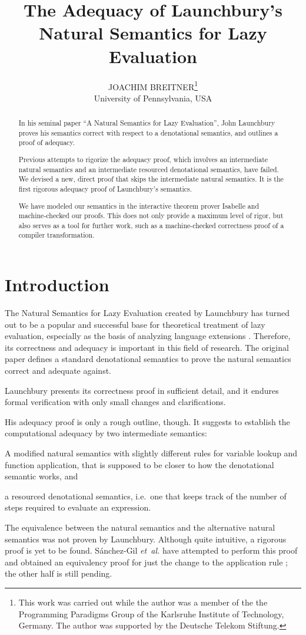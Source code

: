 \documentclass{jfp1}
\title[The Adequacy of Launchbury's Semantics]
      {The Adequacy of Launchbury's\\ Natural Semantics for Lazy Evaluation}
\author[J. Breitner]
	{JOACHIM BREITNER\thanks{This work was carried out while the author was
	a member of the the Programming Paradigms Group of the Karlsruhe
	Institute of Technology, Germany. The author was supported by the
	Deutsche Telekom Stiftung. }\\
         University of Pennsylvania, USA\\
         \email{joachim@cis.upenn.edu}}
\theoremstyle{nonumberbreak}
\begin{document}
\label{firstpage}

\maketitle

\begin{abstract}
In his seminal paper “A Natural Semantics for Lazy Evaluation”, John Launchbury
proves his semantics correct with respect to a denotational semantics, and outlines a proof of adequacy.

Previous attempts to rigorize the adequacy proof, which involves an intermediate natural semantics and an intermediate resourced denotational semantics, have failed. We devised a new, direct proof that skips the intermediate natural semantics. It is the first rigorous adequacy proof of Launchbury’s semantics.

We have modeled our semantics in the interactive theorem prover Isabelle and machine-checked our proofs. This does not only provide a maximum level of rigor, but also serves as a tool for further work, such as a machine-checked correctness proof of a compiler transformation.
\end{abstract}


\section{Introduction}

The Natural Semantics for Lazy Evaluation created by Launchbury  has turned out to be a popular and successful base for theoretical treatment of lazy evaluation, especially as the basis of analyzing language extensions \cite{nakata, nakata_blackhole, distributed, mixed, parallel}. Therefore, its correctness and adequacy is important in this field of research. The original paper defines a standard denotational semantics to prove the natural semantics correct and adequate against.

Launchbury presents its correctness proof in sufficient detail, and it endures formal verification with only small changes and clarifications.

His adequacy proof is only a rough outline, though. It suggests to establish the computational adequacy by two intermediate semantics:
\begin{compactitem}
\item A modified natural semantics with slightly different rules for variable lookup and function application, that is supposed to be closer to how the denotational semantic works, and
\item a resourced denotational semantics, i.e.~one that keeps track of the number of steps required to evaluate an expression.
\end{compactitem}
The equivalence between the natural semantics and the alternative natural semantics was not proven by Launchbury. Although quite intuitive, a rigorous proof is yet to be found. S{\'a}nchez-Gil {\em et~al.} have attempted to perform this proof and obtained an equivalency proof for just the change to the application rule ; the other half is still pending.
\end{document}
